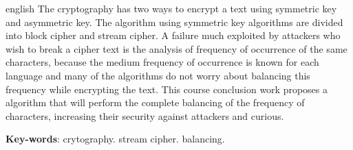 \begin{resumo}[Abstract]
 \begin{otherlanguage*}{english}
The cryptography has two ways to encrypt a text using symmetric key and asymmetric key. The algorithm using symmetric key algorithms are divided into block cipher and stream cipher. A failure much exploited by attackers who wish to break a cipher text is the analysis of frequency of occurrence of the same characters, because the medium frequency of occurrence is known for each language and many of the algorithms do not worry about balancing this frequency while encrypting the text. 
This course conclusion work proposes a algorithm that will perform the complete balancing of the frequency of characters, increasing their security against attackers and curious. 
   \vspace{\onelineskip}
 
   \noindent 
   \textbf{Key-words}: crytography. stream cipher. balancing.
 \end{otherlanguage*}
\end{resumo}
